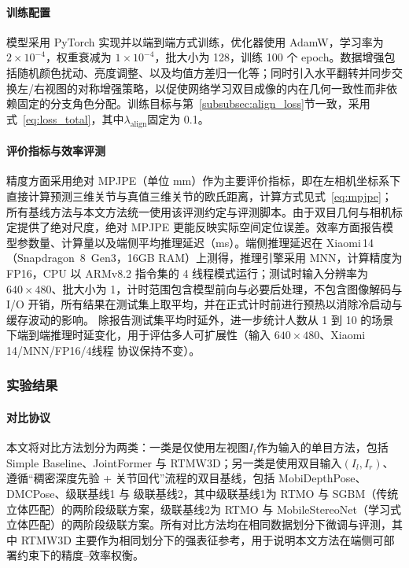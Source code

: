 \paragraph{训练配置}
模型采用 PyTorch 实现并以端到端方式训练，优化器使用 AdamW，学习率为 $2\times10^{-4}$，权重衰减为 $1\times10^{-4}$，批大小为 128，训练 100 个 epoch。数据增强包括随机颜色扰动、亮度调整、以及均值方差归一化等；同时引入水平翻转并同步交换左/右视图的对称增强策略，以促使网络学习双目成像的内在几何一致性而非依赖固定的分支角色分配。训练目标与第~\ref{subsubsec:align_loss}节一致，采用式~\ref{eq:loss_total}，其中$\lambda_{\text{align}}$固定为 0.1。

\paragraph{评价指标与效率评测}
精度方面采用绝对 MPJPE（单位 mm）作为主要评价指标，即在左相机坐标系下直接计算预测三维关节与真值三维关节的欧氏距离，计算方式见式~\ref{eq:mpjpe}；所有基线方法与本文方法统一使用该评测约定与评测脚本。由于双目几何与相机标定提供了绝对尺度，绝对 MPJPE 更能反映实际空间定位误差。效率方面报告模型参数量、计算量以及端侧平均推理延迟（ms）。端侧推理延迟在 Xiaomi\,14（Snapdragon~8~Gen3，16GB RAM）上测得，推理引擎采用 MNN，计算精度为 FP16，CPU 以 ARMv8.2 指令集的 4 线程模式运行；测试时输入分辨率为 $640\times480$、批大小为 1，计时范围包含模型前向与必要后处理，不包含图像解码与 I/O 开销，所有结果在测试集上取平均，并在正式计时前进行预热以消除冷启动与缓存波动的影响。
除报告测试集平均时延外，进一步统计人数从 1 到 10 的场景下端到端推理时延变化，用于评估多人可扩展性（输入 $640\times480$、Xiaomi\,14/MNN/FP16/4线程 协议保持不变）。
\subsubsection{实验结果} 
\paragraph{对比协议}
本文将对比方法划分为两类：一类是仅使用左视图$I_l$作为输入的单目方法，包括 Simple Baseline、JointFormer 与 RTMW3D；另一类是使用双目输入$(I_l,I_r)$、遵循“稠密深度先验 + 关节回代”流程的双目基线，包括 MobiDepthPose、DMCPose、级联基线1 与 级联基线2，其中级联基线1为 RTMO 与 SGBM（传统立体匹配）的两阶段级联方案，级联基线2为 RTMO 与 MobileStereoNet（学习式立体匹配）的两阶段级联方案。所有对比方法均在相同数据划分下微调与评测，其中 RTMW3D 主要作为相同划分下的强表征参考，用于说明本文方法在端侧可部署约束下的精度--效率权衡。

